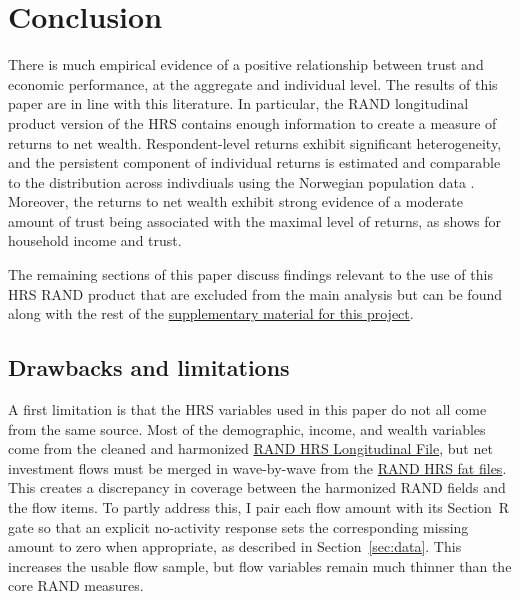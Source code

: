 \onlyinsubfile{\setcounter{section}{5}}
\section{Conclusion}
\label{sec:concl}

\par There is much empirical evidence of a positive relationship between trust and economic performance, at the aggregate and individual level. The results of this paper are in line with this literature. In particular, the RAND longitudinal product version of the HRS contains enough information to create a measure of returns to net wealth. Respondent-level returns exhibit significant heterogeneity, and the persistent component of individual returns is estimated and comparable to the distribution across indivdiuals using the Norwegian population data  \cite{aflgdmlp20}. Moreover, the returns to net wealth exhibit strong evidence of a moderate amount of trust being associated with the maximal level of returns, as \cite{jbpglg2016} shows for household income and trust.

\par The remaining sections of this paper discuss findings relevant to the use of this HRS RAND product that are excluded from the main analysis but can be found along with the rest of the \href{https://github.com/dedwar65/Chp2-TrustandReturns/tree/main/Supplementary}{supplementary material for this project}.

\subsection{Drawbacks and limitations}

\par A first limitation is that the HRS variables used in this paper do not all come from the same source. Most of the demographic, income, and wealth variables come from the cleaned and harmonized \href{https://hrs.isr.umich.edu/news/data-announcements/rand-hrs-longitudinal-file-2018-v1}{RAND HRS Longitudinal File}, but net investment flows must be merged in wave-by-wave from the \href{https://hrsdata.isr.umich.edu/data-products/rand}{RAND HRS fat files}. This creates a discrepancy in coverage between the harmonized RAND fields and the flow items. To partly address this, I pair each flow amount with its Section~R gate so that an explicit no-activity response sets the corresponding missing amount to zero when appropriate, as described in Section~\ref{sec:data}. This increases the usable flow sample, but flow variables remain much thinner than the core RAND measures.

